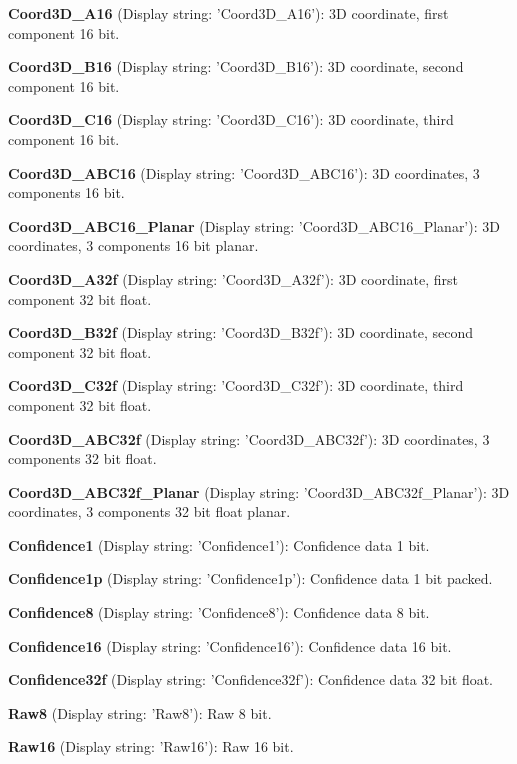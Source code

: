 \begin{DoxyItemize}
\item {\bfseries Coord3\+D\+\_\+\+A16} (Display string\+: 'Coord3\+D\+\_\+\+A16')\+: 3\+D coordinate, first component 16 bit.
\item {\bfseries Coord3\+D\+\_\+\+B16} (Display string\+: 'Coord3\+D\+\_\+\+B16')\+: 3\+D coordinate, second component 16 bit.
\item {\bfseries Coord3\+D\+\_\+\+C16} (Display string\+: 'Coord3\+D\+\_\+\+C16')\+: 3\+D coordinate, third component 16 bit.
\item {\bfseries Coord3\+D\+\_\+\+A\+B\+C16} (Display string\+: 'Coord3\+D\+\_\+\+A\+B\+C16')\+: 3\+D coordinates, 3 components 16 bit.
\item {\bfseries Coord3\+D\+\_\+\+A\+B\+C16\+\_\+\+Planar} (Display string\+: 'Coord3\+D\+\_\+\+A\+B\+C16\+\_\+\+Planar')\+: 3\+D coordinates, 3 components 16 bit planar.
\item {\bfseries Coord3\+D\+\_\+\+A32f} (Display string\+: 'Coord3\+D\+\_\+\+A32f')\+: 3\+D coordinate, first component 32 bit float.
\item {\bfseries Coord3\+D\+\_\+\+B32f} (Display string\+: 'Coord3\+D\+\_\+\+B32f')\+: 3\+D coordinate, second component 32 bit float.
\item {\bfseries Coord3\+D\+\_\+\+C32f} (Display string\+: 'Coord3\+D\+\_\+\+C32f')\+: 3\+D coordinate, third component 32 bit float.
\item {\bfseries Coord3\+D\+\_\+\+A\+B\+C32f} (Display string\+: 'Coord3\+D\+\_\+\+A\+B\+C32f')\+: 3\+D coordinates, 3 components 32 bit float.
\item {\bfseries Coord3\+D\+\_\+\+A\+B\+C32f\+\_\+\+Planar} (Display string\+: 'Coord3\+D\+\_\+\+A\+B\+C32f\+\_\+\+Planar')\+: 3\+D coordinates, 3 components 32 bit float planar.
\item {\bfseries Confidence1} (Display string\+: 'Confidence1')\+: Confidence data 1 bit.
\item {\bfseries Confidence1p} (Display string\+: 'Confidence1p')\+: Confidence data 1 bit packed.
\item {\bfseries Confidence8} (Display string\+: 'Confidence8')\+: Confidence data 8 bit.
\item {\bfseries Confidence16} (Display string\+: 'Confidence16')\+: Confidence data 16 bit.
\item {\bfseries Confidence32f} (Display string\+: 'Confidence32f')\+: Confidence data 32 bit float.
\item {\bfseries Raw8} (Display string\+: 'Raw8')\+: Raw 8 bit.
\item {\bfseries Raw16} (Display string\+: 'Raw16')\+: Raw 16 bit.

\end{DoxyItemize}
